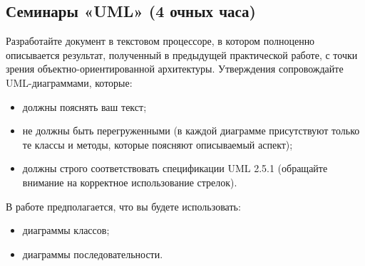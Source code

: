\subsection{Семинары «UML» (4 очных часа)}

Разработайте документ в текстовом процессоре, в котором полноценно 
описывается результат, полученный в предыдущей практической работе, с точки зрения
объектно-ориентированной архитектуры. Утверждения сопровождайте UML-диаграммами,
которые:
\begin{itemize}
    \item должны пояснять ваш текст;
    \item не должны быть перегруженными (в каждой диаграмме присутствуют только
    те классы и методы, которые поясняют описываемый аспект);
    \item должны строго соответствовать спецификации UML 2.5.1 (обращайте
    внимание на корректное использование стрелок).
\end{itemize}

В работе предполагается, что вы будете использовать:
\begin{itemize}
    \item диаграммы классов;
    \item диаграммы последовательности.
\end{itemize}